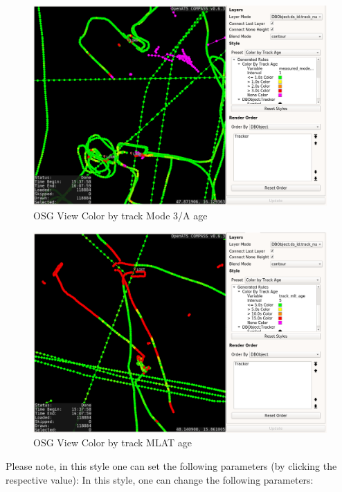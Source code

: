\begin{figure}[H]
    \hspace*{-2.5cm}
    \includegraphics[width=19cm,frame]{../screenshots/osgview_style_track_m3a_age.png}
  \caption{OSG View Color by track Mode 3/A age}
\end{figure}

\begin{figure}[H]
    \hspace*{-2.5cm}
    \includegraphics[width=19cm,frame]{../screenshots/osgview_style_track_mlt_age.png}
  \caption{OSG View Color by track MLAT age}
\end{figure}

Please note, in this style one can set the following parameters (by clicking the respective value):
In this style, one can change the following parameters:

